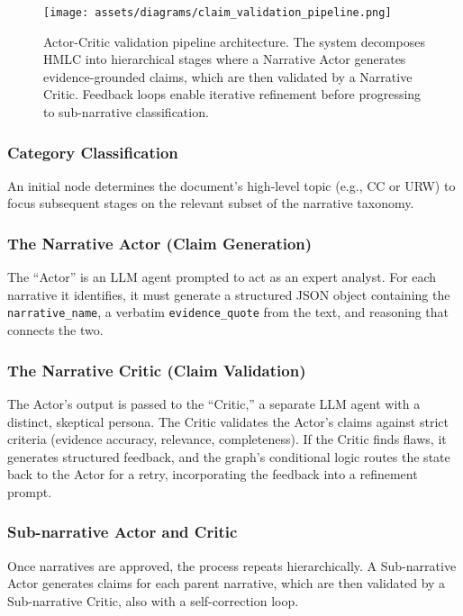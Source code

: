 \begin{figure}[!ht]
\centering
\texttt{[image: assets/diagrams/claim\_validation\_pipeline.png]}
\caption{Actor-Critic validation pipeline architecture. The system decomposes HMLC into hierarchical stages where a Narrative Actor generates evidence-grounded claims, which are then validated by a Narrative Critic. Feedback loops enable iterative refinement before progressing to sub-narrative classification.}
\label{fig:actor_critic_pipeline}
\end{figure}

\subsubsection{Category Classification}

An initial node determines the document's high-level topic (e.g., CC or URW) to focus subsequent stages on the relevant subset of the narrative taxonomy.

\subsubsection{The Narrative Actor (Claim Generation)}

The ``Actor'' is an LLM agent prompted to act as an expert analyst. For each narrative it identifies, it must generate a structured JSON object containing the \texttt{narrative\_name}, a verbatim \texttt{evidence\_quote} from the text, and reasoning that connects the two.

\subsubsection{The Narrative Critic (Claim Validation)}

The Actor's output is passed to the ``Critic,'' a separate LLM agent with a distinct, skeptical persona. The Critic validates the Actor's claims against strict criteria (evidence accuracy, relevance, completeness). If the Critic finds flaws, it generates structured feedback, and the graph's conditional logic routes the state back to the Actor for a retry, incorporating the feedback into a refinement prompt.

\subsubsection{Sub-narrative Actor and Critic}

Once narratives are approved, the process repeats hierarchically. A Sub-narrative Actor generates claims for each parent narrative, which are then validated by a Sub-narrative Critic, also with a self-correction loop.

